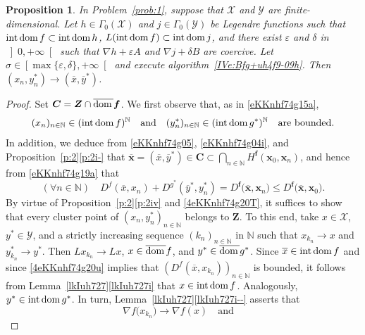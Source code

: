 \documentclass[a4paper,11pt,fleqn]{article}
\renewcommand{\leq}{\ensuremath{\leqslant}}
\newcommand{\XX}{\ensuremath{{\mathcal X}}}
\newcommand{\YY}{\ensuremath{{\mathcal Y}}}
\newcommand{\RPP}{\ensuremath{\left]0,+\infty\right[}}
\newcommand{\NN}{\ensuremath{\mathbb N}}
\newcommand{\pinf}{\ensuremath{{+\infty}}}
\newcommand{\dom}{\ensuremath{\text{\rm dom}\,}}
\newcommand{\intdom}{\ensuremath{\text{\rm int\,dom}\,}}
\newtheorem{proposition}[theorem]{Proposition}
\theoremstyle{plain}{\theorembodyfont{\rmfamily}%
\newtheorem{conjecture}[theorem]{Conjecture}}
\theoremstyle{plain}{\theorembodyfont{\rmfamily}%
\newtheorem{example}[theorem]{Example}}
\theoremstyle{plain}{\theorembodyfont{\rmfamily}%
\newtheorem{remark}[theorem]{Remark}}
\theoremstyle{plain}{\theorembodyfont{\rmfamily}%
\newtheorem{algorithm}[theorem]{Algorithm}}
\theoremstyle{plain}{\theorembodyfont{\rmfamily}%
\newtheorem{condition}[theorem]{Condition}}
\theoremstyle{plain}{\theorembodyfont{\rmfamily}%
\newtheorem{definition}[theorem]{Definition}}
\theoremstyle{plain}{\theorembodyfont{\rmfamily}
\newtheorem{problem}[theorem]{Problem}}
\theoremstyle{plain}{\theorembodyfont{\rmfamily}
\newtheorem{notation}[theorem]{Notation}}
\numberwithin{equation}{section}
\begin{document}
\begin{proposition}
\label{4p:2}
In Problem~\ref{prob:1}, suppose that $\XX$ and $\YY$ 
are finite-dimensional. Let $h\in\Gamma_0(\XX)$ and 
$j\in\Gamma_0(\YY)$ be Legendre functions such that 
$\intdom f\subset\intdom h$, $L(\intdom f)\subset\intdom j$, 
and there exist $\varepsilon$ and $\delta$ in $\RPP$ such that 
$\nabla h+\varepsilon A$ and $\nabla j+\delta B$ are coercive. 
Let $\sigma\in\left[\max\{\varepsilon,\delta\},\pinf\right[$
and execute algorithm~\eqref{IVe:Bfg+uh4f9-09h}. 
Then $(x_n,y_n^*)\to(\overline{x},\overline{y}^*)$.
\end{proposition}
\begin{proof}
Set 
$\boldsymbol{C}=\boldsymbol{Z}\cap\overline{\dom}\boldsymbol{f}$.
We first observe that, as in \eqref{eKKnhf74g15a}, 
\begin{equation}
\label{4eKKnhf74g20T}
(x_n)_{n\in\NN}\in(\intdom f)^{\NN}\quad\text{and}\quad
(y^*_n)_{n\in\NN}\in(\intdom g^*)^{\NN}\quad\text{are bounded}.
\end{equation}
In addition, we deduce from \eqref{eKKnhf74g05},
\eqref{eKKnhf74g04i}, and Proposition~\ref{p:2}\ref{p:2i-} that 
$\overline{\boldsymbol{x}}=(\overline{x},\overline{y}^*)\in
\boldsymbol{C}\subset\bigcap_{n\in\NN}H^{\boldsymbol{f}}
(\boldsymbol{x}_0,\boldsymbol{x}_n)$, and hence from 
\eqref{eKKnhf74g19a} that
\begin{equation}
\label{4eKKnhf74g20u}
(\forall n\in\NN)\quad 
D^f(\overline{x},x_n)+D^{g^*}(\overline{y}^*,y_n^*)
=D^{\boldsymbol{f}}\big(\overline{\boldsymbol{x}},
\boldsymbol{x}_n\big)
\leq D^{\boldsymbol{f}}\big(\overline{\boldsymbol{x}},
\boldsymbol{x}_0\big).
\end{equation}
By virtue of Proposition~\ref{p:2}\ref{p:2iv} and 
\eqref{4eKKnhf74g20T}, it suffices to show that every cluster 
point of $(x_n,y_n^*)_{n\in\NN}$ belongs to $\boldsymbol{Z}$. 
To this end, take $x\in\XX$, $y^*\in\YY$, and 
a strictly increasing sequence $(k_n)_{n\in\NN}$ in $\NN$
such that $x_{k_n}\to x$ and $y_{k_n}^*\to y^*$. 
Then $Lx_{k_n}\to Lx$, $x\in\overline{\dom}f$, and 
$y^*\in\overline{\dom}g^*$. 
Since $\overline{x}\in\intdom f$ and since
\eqref{4eKKnhf74g20u} implies that 
$(D^f(\overline{x},x_{k_n}))_{n\in\NN}$ is bounded,
it follows from Lemma~\ref{lkIuh727}\ref{lkIuh727i} that
$x\in\intdom f$. Analogously, $y^*\in\intdom g^*$. 
In turn, Lemma~\ref{lkIuh727}\ref{lkIuh727i--}
asserts that 
\begin{equation}
\label{4ekIuh725c}
\nabla f\big(x_{k_n}\big)\to\nabla f(x)
\quad\text{and}\quad 

\end{equation}
\end{proof}
\end{document}
